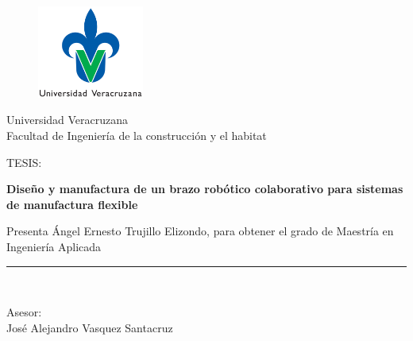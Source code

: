 \begin{titlepage}

\begin{center}
\vspace*{-1in}
\begin{figure}[htb]
\begin{center}
\includegraphics[width=3.5cm]{./img/chapter0/logouv.jpg}
\end{center}
\end{figure}
\begin{Large}
Universidad Veracruzana
\\
\vspace*{0.15in}
Facultad de Ingeniería de la construcción y el habitat \\
\vspace*{0.6in}
\end{Large}
\begin{large}
TESIS:\\
\end{large}
\vspace*{0.2in}
\begin{Large}
\textbf{Diseño y manufactura de un brazo robótico colaborativo para sistemas de manufactura flexible} \\
\end{Large}
\vspace*{0.3in}
\begin{large}
Presenta Ángel Ernesto Trujillo Elizondo, para obtener el grado de Maestría en Ingeniería Aplicada\\
\end{large}
\vspace*{0.3in}
\rule{80mm}{0.1mm}\\
\vspace*{0.1in}
\begin{large}
Asesor: \\
José Alejandro Vasquez Santacruz \\
\end{large}
\end{center}
\end{titlepage}


\tableofcontents
\listoffigures
\listoftables

